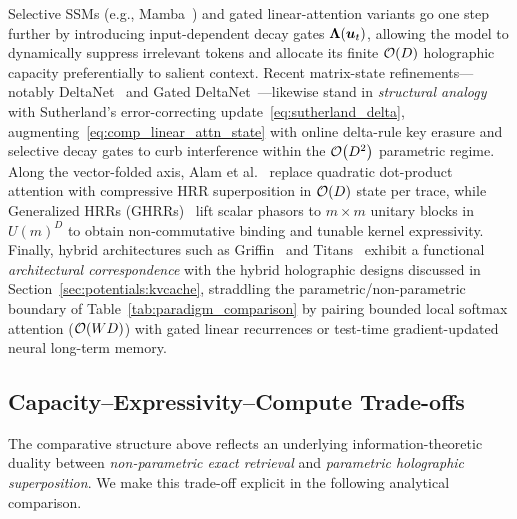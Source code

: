 Selective SSMs (e.g., Mamba~\cite{GU_SSM_S4_MAMBA}) and gated linear-attention variants go one step further by introducing input-dependent decay gates $\mathbf{\Lambda}(\boldsymbol{u}_t)$, allowing the model to dynamically suppress irrelevant tokens and allocate its finite $\mathcal{O}\!\left(D\right)$ holographic capacity preferentially to salient context.
Recent matrix-state refinements---notably DeltaNet~\cite{YANG_2024_DELTANET} and Gated DeltaNet~\cite{YANG_2025_GATED_DELTANET}---likewise stand in \emph{structural analogy} with Sutherland's error-correcting update~\eqref{eq:sutherland_delta}, augmenting~\eqref{eq:comp_linear_attn_state} with online delta-rule key erasure and selective decay gates to curb interference within the $\mathcal{O}\!\left(D^2\right)$ parametric regime.
Along the vector-folded axis, Alam et al.~\cite{HOLOGRAPHIC_ATTENTION_OR_KV_CACHE} replace quadratic dot-product attention with compressive HRR superposition in $\mathcal{O}\!\left(D\right)$ state per trace, while Generalized HRRs (GHRRs)~\cite{YEUNG_2024_GHRR} lift scalar phasors to $m \times m$ unitary blocks in $U(m)^D$ to obtain non-commutative binding and tunable kernel expressivity.
Finally, hybrid architectures such as Griffin~\cite{DE_2024_GRIFFIN} and Titans~\cite{BEHROUZ_2025_TITANS} exhibit a functional \emph{architectural correspondence} with the hybrid holographic designs discussed in Section~\ref{sec:potentials:kvcache}, straddling the parametric/non-parametric boundary of Table~\ref{tab:paradigm_comparison} by pairing bounded local softmax attention ($\mathcal{O}\!\left(WD\right)$) with gated linear recurrences or test-time gradient-updated neural long-term memory.

\subsection{Capacity--Expressivity--Compute Trade-offs}\label{sec:comparison:tradeoffs}

The comparative structure above reflects an underlying information-theoretic duality between \emph{non-parametric exact retrieval} and \emph{parametric holographic superposition}.
We make this trade-off explicit in the following analytical comparison.


